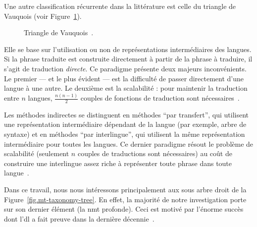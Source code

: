 Une autre classification récurrente dans la littérature 
est celle du triangle de Vauquois (voir Figure~\ref{fig.vauquois-triangle}).
\begin{figure}[hbt]
    \begin{center}
        
    \end{center}
    \caption[Triangle de Vauquois.]
    {Triangle de Vauquois~\cite{hybrid-mt}.}
    \label{fig.vauquois-triangle}
\end{figure}
Elle se base sur l'utilisation ou non de représentations intermédiaires des langues.
Si la phrase traduite est construite directement à partir de la phrase à traduire,
il s'agit de traduction \emph{directe}.
Ce paradigme présente deux majeurs inconvénients.
Le premier --- et le plus évident --- est la difficulté de passer directement d'une langue à une autre.
Le deuxième est la scalabilité : pour maintenir la traduction entre \(n\) langues,
\(\frac{n(n - 1)}{2}\) couples de fonctions de traduction sont nécessaires~\cite{routledge}.

Les méthodes indirectes se distinguent en méthodes ``par transfert'', 
qui utilisent une représentation intermédiaire dépendant de la langue (par exemple, arbre de syntaxe)
et en méthodes ``par interlingue'',
qui utilisent la même représentation intermédiaire pour toutes les langues.
Ce dernier paradigme résout le problème de scalabilité 
(seulement \(n\) couples de traductions sont nécessaires)
au coût de construire une interlingue assez riche à représenter toute phrase dans toute langue~\cite{routledge}.

Dans ce travail, 
nous nous intéressons principalement aux sous arbre droit de la Figure~\ref{fig.mt-taxonomy-tree}.
En effet, la majorité de notre investigation porte sur son dernier élément (la \gls{nmt} profonde).
Ceci est motivé par l'énorme succès 
dont l'\gls{dl} a fait preuve dans la dernière décennie~\cite{Raschka_Mirjalili_2017}.
